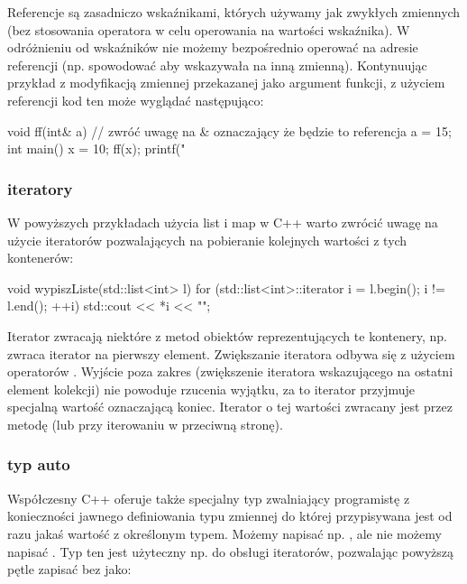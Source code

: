 Referencje są zasadniczo wskaźnikami, których używamy jak zwykłych zmiennych (bez stosowania operatora \cpp{*} w celu operowania na wartości wskaźnika).
W odróżnieniu od wskaźników nie możemy bezpośrednio operować na adresie referencji (np. spowodować aby wskazywała na inną zmienną).
Kontynuując przykład z modyfikacją zmiennej przekazanej jako argument funkcji, z użyciem referencji kod ten może wyglądać następująco:

\begin{CodeFrame*}[c]{}
void ff(int& a) { // zwróć uwagę na & oznaczający że będzie to referencja
    a = 15;
}
int main() {
    x = 10;
    ff(x);
    printf("%
}
\end{CodeFrame*}

\subsubsection{iteratory}

W powyższych przykładach użycia list i map w C++ warto zwrócić uwagę na użycie iteratorów pozwalających na pobieranie kolejnych wartości z tych kontenerów:

\begin{CodeFrame*}[cpp]{}
void wypiszListe(std::list<int> l) {
    for (std::list<int>::iterator i = l.begin(); i != l.end(); ++i) {
        std::cout << *i << "\n";
    }
}
\end{CodeFrame*}

Iterator zwracają niektóre z metod obiektów reprezentujących te kontenery, np.  zwraca iterator na pierwszy element.
Zwiększanie iteratora odbywa się z użyciem operatorów \cpp{++}.
Wyjście poza zakres (zwiększenie iteratora wskazującego na ostatni element kolekcji) nie powoduje rzucenia wyjątku, za to iterator przyjmuje specjalną wartość oznaczającą koniec.
Iterator o tej wartości zwracany jest przez metodę  (lub  przy iterowaniu w przeciwną stronę).

\subsubsection{typ auto}

Współczesny C++ oferuje także specjalny typ  zwalniający programistę z konieczności jawnego definiowania typu zmiennej do której przypisywana jest od razu jakaś wartość z określonym typem. Możemy napisać np. , ale nie możemy napisać . Typ ten jest użyteczny np. do obsługi iteratorów, pozwalając powyższą pętle zapisać bez  jako:

